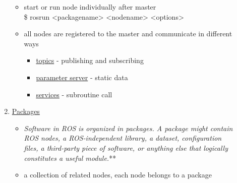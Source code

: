 \documentclass[12pt]{article}
\begin{document}
\begin{description}
\begin{enumerate}
\begin{itemize}
\begin{itemize}
                        \end{itemize}
                    \item start or run node individually after master\vspace{5mm}\\
                    {\selectfont  \hspace{5mm} \$ rosrun <packagename> <nodename> <options> } \vspace{1mm}\\
                  
                    \item all nodes are registered to the master and communicate in different ways
                        \begin{itemize}
                            \item  \href{http://wiki.ros.org/Topics}{topics} - publishing and subscribing
                            \item \href{http://wiki.ros.org/Parameter%20Serverparameters}{parameter server} - static data
                            \item \href{http://wiki.ros.org/Services}{services} - subroutine call
                        \end{itemize}    
                                      
                \end{itemize}
                
            \item \href{http://wiki.ros.org/Packages}{Packages} 

                \begin{itemize}
                    \item {\it Software in ROS is organized in packages. A package might contain ROS nodes, a ROS-independent library, a dataset, configuration files, a third-party piece of software, or anything else that logically constitutes a useful module.}** 
                    \item a collection of related nodes, each node belongs to a package
                                     

\end{itemize}
\end{enumerate}
\end{description}
\end{document}
